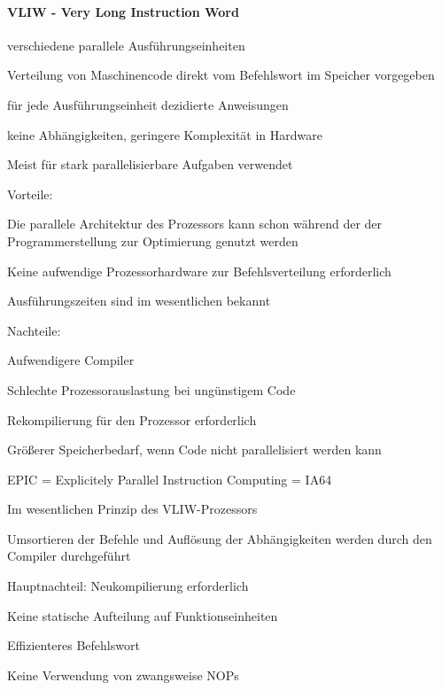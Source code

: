 \documentclass[10pt,landscape]{article}
\begin{document}
\begin{multicols}{3}
  \paragraph{ VLIW - Very Long Instruction Word}
  \begin{itemize*}
    \item verschiedene parallele Ausführungseinheiten
    \item Verteilung von Maschinencode direkt vom Befehlswort im Speicher vorgegeben
    \item für jede Ausführungseinheit dezidierte Anweisungen
    \item keine Abhängigkeiten, geringere Komplexität in Hardware
    \item Meist für stark parallelisierbare Aufgaben verwendet
    \item Vorteile:
    \begin{itemize*}
      \item Die parallele Architektur des Prozessors kann schon während der der Programmerstellung zur Optimierung genutzt werden
      \item Keine aufwendige Prozessorhardware zur Befehlsverteilung erforderlich
      \item Ausführungszeiten sind im wesentlichen bekannt
    \end{itemize*}
    \item Nachteile:
    \begin{itemize*}
      \item Aufwendigere Compiler
      \item Schlechte Prozessorauslastung bei ungünstigem Code
      \item Rekompilierung für den Prozessor erforderlich
      \item Größerer Speicherbedarf, wenn Code nicht parallelisiert werden kann
    \end{itemize*}
  \end{itemize*}
  
  
  EPIC = Explicitely Parallel Instruction Computing = IA64
  \begin{itemize*}
    \item Im wesentlichen Prinzip des VLIW-Prozessors
    \item Umsortieren der Befehle und Auflösung der Abhängigkeiten werden durch den Compiler durchgeführt
    \item Hauptnachteil: Neukompilierung erforderlich
    \item Keine statische Aufteilung auf Funktionseinheiten
    \item Effizienteres Befehlswort
    \item Keine Verwendung von zwangsweise NOPs
  \end{itemize*}
  

\end{multicols}
\end{document}
